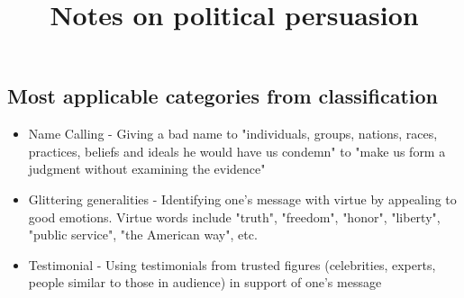 \documentclass[letterpaper]{article}
\title{Notes on political persuasion}
\begin{document}
\maketitle

\subsection{Most applicable categories from classification}
\begin{itemize}
	\item Name Calling - Giving a bad name to "individuals, groups, nations, races, practices, beliefs and ideals he would have us condemn" to "make us form a judgment without examining the evidence"
	\item Glittering generalities - Identifying one's message with virtue by appealing to good emotions. Virtue words include "truth", "freedom", "honor", "liberty", "public service", "the American way", etc. 
	\item Testimonial - Using testimonials from trusted figures (celebrities, experts, people similar to those in audience) in support of one's message
	

\end{itemize}
\end{document}
